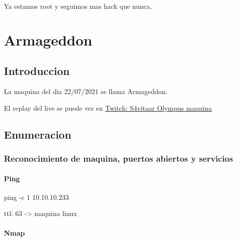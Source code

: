 \documentclass{assets/ipesethesis}
\newenvironment{Shaded}{\begin{snugshade}}{\end{snugshade}}
\newcommand{\FunctionTok}[1]{\textcolor[rgb]{0.00,0.00,0.00}{#1}}
\newcommand{\NormalTok}[1]{#1}
\begin{document}
Ya estamos root y seguimos mas hack que nunca.

\hypertarget{armageddon}{%
\chapter*{Armageddon}\label{armageddon}}

\hypertarget{introduccion-2}{%
\section*{Introduccion}\label{introduccion-2}}

La maquina del dia 22/07/2021 se llama Armageddon.

El replay del live se puede ver en \href{https://www.twitch.tv/videos/1094808182}{Twitch: S4vitaar Olympus maquina}

\hypertarget{enumeracion-2}{%
\section*{Enumeracion}\label{enumeracion-2}}

\hypertarget{reconocimiento-de-maquina-puertos-abiertos-y-servicios-2}{%
\subsection*{Reconocimiento de maquina, puertos abiertos y servicios}\label{reconocimiento-de-maquina-puertos-abiertos-y-servicios-2}}

\hypertarget{ping-2}{%
\subsubsection*{Ping}\label{ping-2}}

\begin{Shaded}
\begin{Highlighting}[]
\FunctionTok{ping}\NormalTok{ -c 1 10.10.10.233}
\end{Highlighting}
\end{Shaded}

ttl: 63 -\textgreater{} maquina linux

\hypertarget{nmap-2}{%
\subsubsection*{Nmap}\label{nmap-2}}
\end{document}
